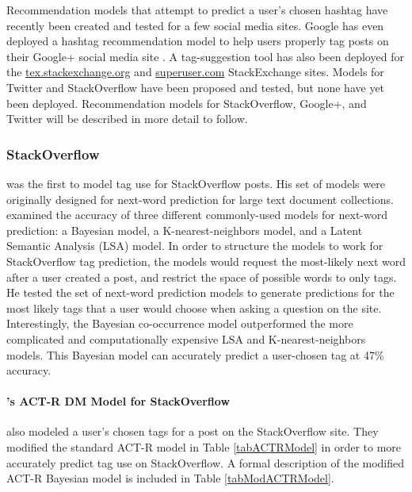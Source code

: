 \documentclass[man,floatsintext,donotrepeattitle]{apa6}
\begin{document}
Recommendation models that attempt to predict a user's chosen hashtag have recently been created and tested for a few social media sites.
Google has even deployed a hashtag recommendation model to help users properly tag posts on their Google+ social media site \parencite{GoogleKeynote2013}.
A tag-suggestion tool has also been deployed for the \url{tex.stackexchange.org} and \url{superuser.com} StackExchange sites.
Models for Twitter and StackOverflow have been proposed and tested, but none have yet been deployed.
Recommendation models for StackOverflow, Google+, and Twitter will be described in more detail to follow.

\subsubsection{StackOverflow}

\textcite{Kuo2011} was the first to model tag use for StackOverflow posts.
His set of models were originally designed for next-word prediction for large text document collections.
\citeauthor{Kuo2011} examined the accuracy of three different commonly-used models for next-word prediction: a Bayesian model, a K-nearest-neighbors model, and a Latent Semantic Analysis (LSA) model.
In order to structure the models to work for StackOverflow tag prediction, the models would request the most-likely next word after a user created a post, and restrict the space of possible words to only tags.
He tested the set of next-word prediction models to generate predictions for the most likely tags that a user would choose when asking a question on the site.
Interestingly, the Bayesian co-occurrence model outperformed the more complicated and computationally expensive LSA and K-nearest-neighbors models.
This Bayesian model can accurately predict a user-chosen tag at 47\% accuracy.

\paragraph{\texorpdfstring{\textcite{Stanley2013}}{Stanley2013}'s ACT-R DM Model for StackOverflow}

\textcite{Stanley2013} also modeled a user's chosen tags for a post on the StackOverflow site.
They modified the standard ACT-R model in Table \ref{tabACTRModel} in order to more accurately predict tag use on StackOverflow.
A formal description of the modified ACT-R Bayesian model is included in Table \ref{tabModACTRModel}.
\end{document}
